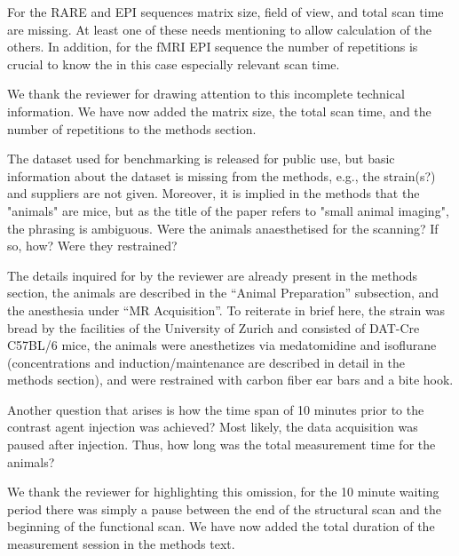 \begin{point}
	For the RARE and EPI sequences matrix size, field of view, and total scan time are missing. At least one of these needs mentioning to allow calculation of the others. In addition, for the fMRI EPI sequence the number of repetitions is crucial to know the in this case especially
relevant scan time.
\end{point}
\begin{reply}
	We thank the reviewer for drawing attention to this incomplete technical information.
	We have now added the matrix size, the total scan time, and the number of repetitions to the methods section.
\end{reply}

\begin{point}
	The dataset used for benchmarking is released for public use, but basic information about the dataset is missing from the methods, e.g., the strain(s?) and suppliers are not given. Moreover, it is implied in the methods that the "animals" are mice, but as the title of the
paper refers to "small animal imaging", the phrasing is ambiguous. Were the animals anaesthetised for the scanning? If so, how? Were they restrained?
\end{point}
\begin{reply}
	The details inquired for by the reviewer are already present in the methods section, the animals are described in the “Animal Preparation” subsection, and the anesthesia under “MR Acquisition”.
	To reiterate in brief here, the strain was bread by the facilities of the University of Zurich and consisted of DAT-Cre C57BL/6 mice, the animals were anesthetizes via medatomidine and isoflurane (concentrations and induction/maintenance are described in detail in the methods section), and were restrained with carbon fiber ear bars and a bite hook.
\end{reply}

\begin{point}
	Another question that arises is how the time span of 10 minutes prior to the contrast agent injection was achieved? Most likely, the data acquisition was paused after injection. Thus, how long was the total measurement time for the animals?
\end{point}
\begin{reply}
	We thank the reviewer for highlighting this omission, for the 10 minute waiting period there was simply a pause between the end of the structural scan and the beginning of the functional scan.
	We have now added the total duration of the measurement session in the methods text.
\end{reply}

